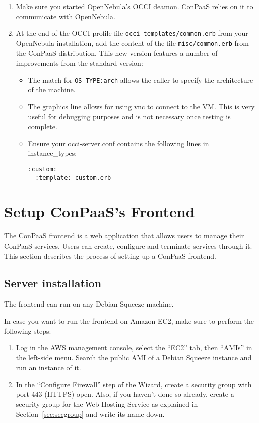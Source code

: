 \documentclass[10pt]{article}
\begin{document}
\begin{enumerate}
\item Make sure you started OpenNebula's OCCI deamon. ConPaaS relies
  on it to communicate with OpenNebula.

\item At the end of the OCCI profile file \verb+occi_templates/common.erb+ 
  from your OpenNebula installation, add the content of the file
  \verb+misc/common.erb+ from the ConPaaS distribution. This new version 
  features a number of improvements from the standard version:
  \begin{itemize}
  \item The match for \verb+OS TYPE:arch+ allows the caller to specify
    the architecture of the machine.
  \item The graphics line allows for using vnc to connect to the VM.
    This is very useful for debugging purposes and is not necessary
    once testing is complete.
\item Ensure your occi-server.conf contains the following lines in instance\_types:
\begin{verbatim}
:custom:
  :template: custom.erb
\end{verbatim}

  \end{itemize}
\end{enumerate}

\section{Setup ConPaaS's Frontend}
\label{sec:frontend}

The ConPaaS frontend is a web application that allows users to manage
their ConPaaS services. Users can create, configure and terminate
services through it. This section describes the process of setting up
a ConPaaS frontend.

\subsection{Server installation}
\label{sec:frontend-server}

The frontend can run on any Debian Squeeze machine. 

In case you want to run the frontend on Amazon EC2, make sure to perform the
following steps:

\begin{enumerate}
\item Log in the AWS management console, select the ``EC2'' tab, then ``AMIs''
  in the left-side menu. Search the public AMI of a Debian Squeeze instance and
  run an instance of it.
\item In the ``Configure Firewall'' step of the Wizard, create a security group
  with port 443 (HTTPS) open. Also, if you haven't done so already, create a
  security group for the Web Hosting Service as explained in
  Section~\ref{sec:secgroup} and write its name down.
\end{enumerate}
\end{document}
